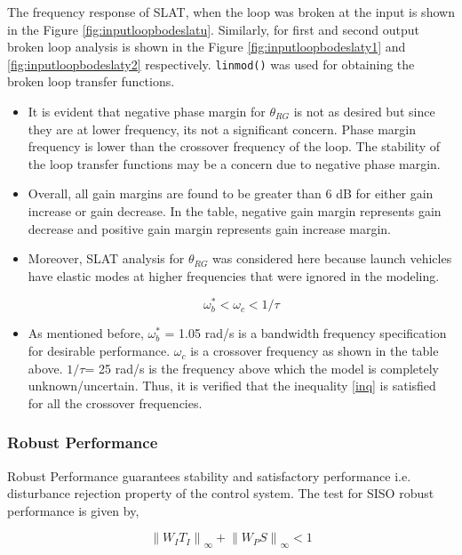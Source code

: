 \documentclass[12pt]{article}
\newcommand{\norm}[1]{\left\lVert#1\right\rVert}
\begin{document}
	\noindent The frequency response of SLAT, when the loop was broken at the input is shown in the Figure \ref{fig:inputloopbodeslatu}. Similarly, for first and second output broken loop analysis is shown in the Figure \ref{fig:inputloopbodeslaty1} and \ref{fig:inputloopbodeslaty2} respectively. \texttt{linmod()} was used for obtaining the broken loop transfer functions. 
	
	\begin{itemize}
		\item It is evident that negative phase margin for $\theta_{RG}$ is not as desired but since they are at lower frequency, its not a significant concern. Phase margin frequency is lower than the crossover frequency of the loop. The stability of the loop transfer functions may be a concern due to negative phase margin. 
		\item Overall, all gain margins are found to be greater than 6 dB for either gain increase or gain decrease. In the table, negative gain margin represents gain decrease and positive gain margin represents gain increase margin. 
		\item Moreover, SLAT analysis for $\theta_{RG}$ was considered here because launch vehicles have elastic modes at higher frequencies that were ignored in the modeling. 
		
		
		\begin{equation}
		\label{inq}
		\omega_b^* < \omega_c < 1/\tau
		\end{equation}
		
		\item As mentioned before, $\omega_b^*$ = 1.05 rad/s is a bandwidth frequency specification for desirable performance. $\omega_c$ is a crossover frequency as shown in the table above. $1/\tau$= 25 rad/s is the frequency above which the model is completely unknown/uncertain. Thus, it is verified that the inequality \ref{inq} is satisfied for all the crossover frequencies.
	\end{itemize}
	\subsubsection{Robust Performance}
	
	Robust Performance guarantees stability and satisfactory performance i.e. disturbance rejection property of the control system. The test for SISO robust performance is given by,
	
	\begin{equation}
	\label{eqSISOTest}
	\norm{W_I T_{I}}_{\infty} + \norm{W_P S}_{\infty}< 1 
	\end{equation}
	
\end{document}
